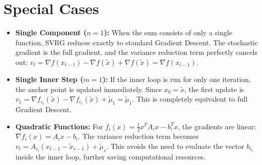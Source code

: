 \documentclass[11pt]{article}
\begin{document}
\section*{Special Cases}
\begin{itemize}
    \item \textbf{Single Component ($n=1$):} When the sum consists of only a single function, SVRG reduces exactly to standard Gradient Descent. The stochastic gradient is the full gradient, and the variance reduction term perfectly cancels out: $v_t = \nabla f(x_{t-1}) - \nabla f(\tilde{x}) + \nabla f(\tilde{x}) = \nabla f(x_{t-1})$.
    \item \textbf{Single Inner Step ($m=1$):} If the inner loop is run for only one iteration, the anchor point is updated immediately. Since $x_0 = \tilde{x}$, the first update is $v_1 = \nabla f_{i_1}(\tilde{x}) - \nabla f_{i_1}(\tilde{x}) + \tilde{\mu}_1 = \tilde{\mu}_1$. This is completely equivalent to full Gradient Descent.
    \item \textbf{Quadratic Functions:} For $f_i(x) = \frac{1}{2} x^T A_i x - b_i^T x$, the gradients are linear: $\nabla f_i(x) = A_i x - b_i$. The variance reduction term becomes $v_t = A_{i_t}(x_{t-1} - \tilde{x}_{s-1}) + \tilde{\mu}_s$. This avoids the need to evaluate the vector $b_{i_t}$ inside the inner loop, further saving computational resources.
\end{itemize}
\end{document}
